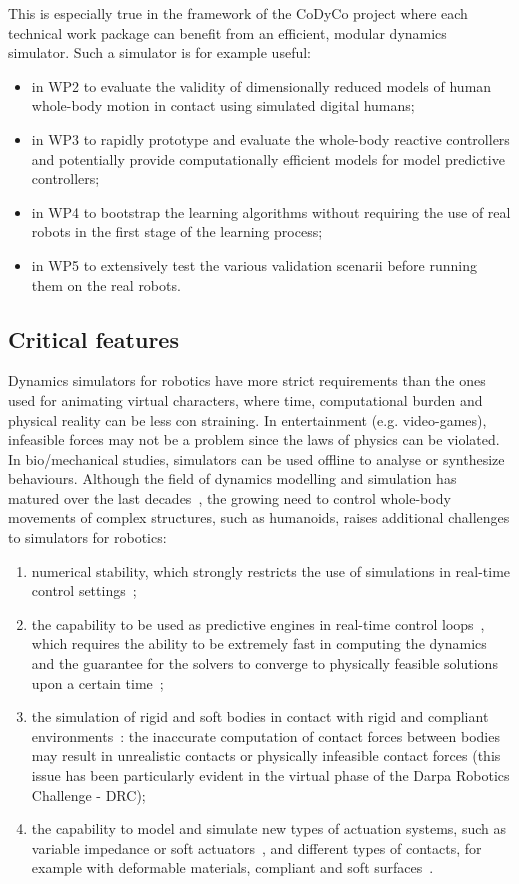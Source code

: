 \documentclass[12pt,a4paper,twoside]{article}
\begin{document}
This is especially true in the framework of the CoDyCo project where each technical work package can benefit from an efficient, modular dynamics simulator. Such a simulator is for example useful:
\begin{itemize}
\item in WP2 to evaluate the validity of dimensionally reduced models of human whole-body motion in contact using simulated digital humans;
\item in WP3 to rapidly prototype and evaluate the whole-body reactive controllers and potentially provide computationally efficient models for model predictive controllers;
\item in WP4 to bootstrap the learning algorithms without requiring the use of real robots in the first stage of the learning process;
\item in WP5 to extensively test the various validation scenarii before running them on the real robots.
\end{itemize}

\subsection{Critical features}

Dynamics simulators for robotics have more strict requirements than the ones used for animating virtual characters, where time, computational burden and physical reality can be less con straining. In entertainment (e.g. video-games), infeasible forces may not be a problem since the laws of physics can be violated. In bio/mechanical studies, simulators can be used offline to analyse or synthesize behaviours. Although the field of dynamics modelling and simulation has matured over the last decades~\cite{Featherstone2008,Jain2011,Todorov2014}, the growing need to control whole-body movements of complex structures, such as humanoids, raises additional challenges to simulators for robotics:
\begin{enumerate}
\item numerical stability, which strongly restricts the use of simulations in real-time control settings~\cite{Drumwright2011,Drumwright2012};
\item the capability to be used as predictive engines in real-time control loops~\cite{Todorov2012}, which requires the ability to be extremely fast in computing the dynamics and the guarantee for the solvers to converge to physically feasible solutions upon a certain time~\cite{Todorov2011};
\item the simulation of rigid and soft bodies in contact with rigid and compliant environments~\cite{Brogliato2002,Jia2013}: the inaccurate computation of contact forces between bodies may result in unrealistic contacts or physically infeasible contact forces (this issue has been particularly evident in the virtual phase of the Darpa Robotics Challenge - DRC);
\item the capability to model and simulate new types of actuation systems, such as variable impedance or soft actuators~\cite{Duriez2013}, and different types of contacts, for example with deformable materials, compliant and soft surfaces~\cite{Duriez2006}.
\end{enumerate}
\end{document}
